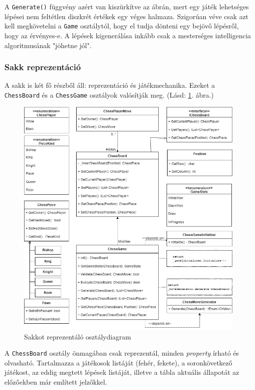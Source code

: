 \documentclass[twoside, a4paper, 12pt]{article}
\begin{document}
A \texttt{Generate()} függvény azért van kiszürkítve az ábrán, mert egy játék lehetséges lépései nem feltétlen diszkrét értékek egy véges halmaza. Szigorúan véve csak azt kell megkövetelni a \texttt{Game} osztálytól, hogy el tudja dönteni egy bejövő lépésről, hogy az érvényes-e. A lépések kigenerálása inkább csak a mesterséges intelligencia algoritmusának "jöhetne jól".

\subsubsection{Sakk reprezentáció}
A sakk is két fő részből áll: reprezentáció és játékmechanika. Ezeket a \texttt{ChessBoard} és a \texttt{ChessGame} osztályok valósítják meg. (Lásd: \ref{fig:chessClassDiagram}. ábra.)

\begin{figure}[htbp]
	\centering
	\includegraphics[width=\textwidth]{img/chessClassDiagram.png}
	\caption{Sakkot reprezentáló osztálydiagram}
	\label{fig:chessClassDiagram}
\end{figure}

A \texttt{ChessBoard} osztály önmagában csak reprezentál, minden \textit{property} írható és olvasható. Tartalmazza a játékosok listáját (fehér, fekete), a soronkövetkező játékost, az eddig megtett lépések listáját, illetve a tábla aktuális állapotát az előzőekben már említett jelzőkkel.
\end{document}
